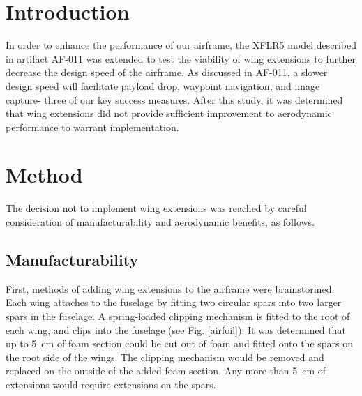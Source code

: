\documentclass[]{auvsi_doc}
\begin{document}
\begin{AUVSITitlePage}
\begin{artifacttable}
\end{artifacttable}
\end{AUVSITitlePage}

\section{Introduction}
In order to enhance the performance of our airframe, the XFLR5 model described in artifact AF-011 was extended to test the viability of wing extensions to further decrease the design speed of the airframe. As discussed in AF-011, a slower design speed will facilitate payload drop, waypoint navigation, and image capture- three of our key success measures. After this study, it was determined that wing extensions did not provide sufficient improvement to aerodynamic performance to warrant implementation.

\section{Method}
The decision not to implement wing extensions was reached by careful consideration of manufacturability and aerodynamic benefits, as follows.

\subsection{Manufacturability}
First, methods of adding wing extensions to the airframe were brainstormed. Each wing attaches to the fuselage by fitting two circular spars into two larger spars in the fuselage. A spring-loaded clipping mechanism is fitted to the root of each wing, and clips into the fuselage (see Fig. \ref{airfoil}). It was determined that up to 5~cm of foam section could be cut out of foam and fitted onto the spars on the root side of the wings. The clipping mechanism would be removed and replaced on the outside of the added foam section. Any more than 5~cm of extensions would require extensions on the spars. 
\end{document}
